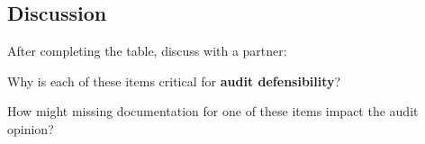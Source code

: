 \documentclass[11pt,a4paper,openany]{memoir}
\begin{document}

\subsection*{Discussion}
After completing the table, discuss with a partner:
\begin{compactitem}
    \item Why is each of these items critical for \textbf{audit defensibility}?
    \item How might missing documentation for one of these items impact the audit opinion?
\end{compactitem}
\end{document}
